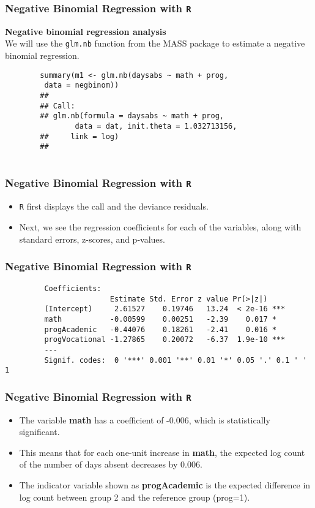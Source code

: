 \documentclass[MASTER.tex]{subfiles}
\begin{document}
\begin{frame}[fragile]
	\frametitle{Negative Binomial Regression with \texttt{R} }
	\large
	
\textbf{Negative binomial regression analysis}\\
	We will use the \texttt{glm.nb} function from the MASS package to estimate a negative binomial regression.
	\begin{verbatim}
		summary(m1 <- glm.nb(daysabs ~ math + prog, 
		 data = negbinom))
		## 
		## Call:
		## glm.nb(formula = daysabs ~ math + prog, 
		        data = dat, init.theta = 1.032713156, 
		##     link = log)
		## 
		 
			\end{verbatim}
	\end{frame}
\begin{frame}[fragile]
	\frametitle{Negative Binomial Regression with \texttt{R} }
	\Large
	\vspace{-1cm}
	\begin{itemize}
		\item \texttt{R} first displays the call and the deviance residuals. 
		\item Next, we see the regression coefficients for each of the variables, along with standard errors, z-scores, 
		and p-values. 
	\end{itemize}
\end{frame}
	\begin{frame}[fragile]
		\frametitle{Negative Binomial Regression with \texttt{R} }

		\begin{verbatim} 
		 Coefficients:
		                Estimate Std. Error z value Pr(>|z|)    
		 (Intercept)     2.61527    0.19746   13.24  < 2e-16 ***
		 math           -0.00599    0.00251   -2.39    0.017 *  
		 progAcademic   -0.44076    0.18261   -2.41    0.016 *  
		 progVocational -1.27865    0.20072   -6.37  1.9e-10 ***
		 ---
		 Signif. codes:  0 '***' 0.001 '**' 0.01 '*' 0.05 '.' 0.1 ' ' 1

		\end{verbatim}

	
\end{frame}

\begin{frame}[fragile]
	\frametitle{Negative Binomial Regression with \texttt{R} }
	\Large
	\begin{itemize}
		\item The variable \textbf{math} has a coefficient of -0.006, which is statistically significant.
		\item This means that for each one-unit increase in \textbf{math}, the expected log count of the number of days absent decreases by 0.006. 
		\item The indicator variable shown as \textbf{progAcademic} is the expected difference in log count between group 2 and the reference group (prog=1). 
	\end{itemize}
\end{frame}
\end{document}
